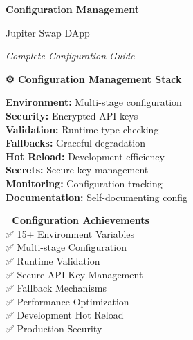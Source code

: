 \documentclass[11pt,a4paper]{article}
\begin{document}
\begin{titlepage}
    \centering
    \vspace*{1cm}
    
    {\Huge\textbf{\textcolor{jupiterBlue}{Configuration Management}}\par}
    \vspace{0.5cm}
    {\LARGE\textcolor{deauraPurple}{Jupiter Swap DApp}\par}
    \vspace{0.3cm}
    {\Large\textit{Complete Configuration Guide}\par}
    
    \vspace{1.5cm}
    
    \begin{tcolorbox}[colback=jupiterBlue!10,colframe=jupiterBlue,width=0.9\textwidth]
        \centering
        \textbf{⚙️ Configuration Management Stack}\\
        \vspace{0.5cm}
        \begin{multicols}{2}
        \textbf{Environment:} Multi-stage configuration\\
        \textbf{Security:} Encrypted API keys\\
        \textbf{Validation:} Runtime type checking\\
        \textbf{Fallbacks:} Graceful degradation\\
        \textbf{Hot Reload:} Development efficiency\\
        \textbf{Secrets:} Secure key management\\
        \textbf{Monitoring:} Configuration tracking\\
        \textbf{Documentation:} Self-documenting config
        \end{multicols}
    \end{tcolorbox}
    
    \vspace{1.5cm}
    
    \begin{tcolorbox}[colback=successGreen!10,colframe=successGreen,width=0.8\textwidth]
        \centering
        \textbf{🎯 Configuration Achievements}\\
        \vspace{0.3cm}
        ✅ 15+ Environment Variables\\
        ✅ Multi-stage Configuration\\
        ✅ Runtime Validation\\
        ✅ Secure API Key Management\\
        ✅ Fallback Mechanisms\\
        ✅ Performance Optimization\\
        ✅ Development Hot Reload\\
        ✅ Production Security
    \end{tcolorbox}
    

\end{titlepage}
\end{document}
